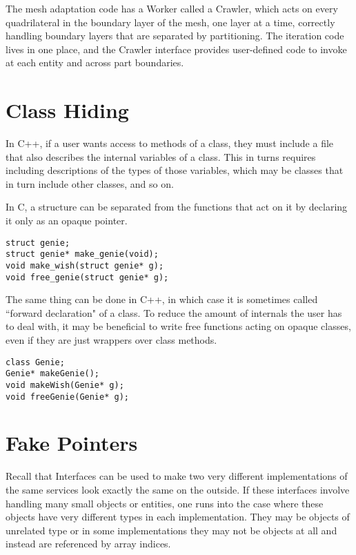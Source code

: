 \documentclass{article}
\begin{document}
The mesh adaptation code has a Worker called a Crawler, which acts on
every quadrilateral in the boundary layer of the mesh, one layer at a
time, correctly handling boundary layers that are separated by partitioning.
The iteration code lives in one place, and the Crawler interface provides
user-defined code to invoke at each entity and across part boundaries.

\section{Class Hiding}

In C++, if a user wants access to methods of a class, they must include
a file that also describes the internal variables of a class.
This in turns requires including descriptions of the types of those
variables, which may be classes that in turn include other classes,
and so on.

In C, a structure can be separated from the functions that act on it
by declaring it only as an opaque pointer.

\begin{lstlisting}
struct genie;
struct genie* make_genie(void);
void make_wish(struct genie* g);
void free_genie(struct genie* g);
\end{lstlisting}

The same thing can be done in C++, in which case it is sometimes called
``forward declaration" of a class.
To reduce the amount of internals the user has to deal with, it may be
beneficial to write free functions acting on opaque classes, even if they
are just wrappers over class methods.

\begin{lstlisting}
class Genie;
Genie* makeGenie();
void makeWish(Genie* g);
void freeGenie(Genie* g);
\end{lstlisting}

\section{Fake Pointers}

Recall that Interfaces can be used to make two very different implementations
of the same services look exactly the same on the outside.
If these interfaces involve handling many small objects or entities,
one runs into the case where these objects have very different types in
each implementation.
They may be objects of unrelated type or in some implementations they may
not be objects at all and instead are referenced by array indices.
\end{document}
